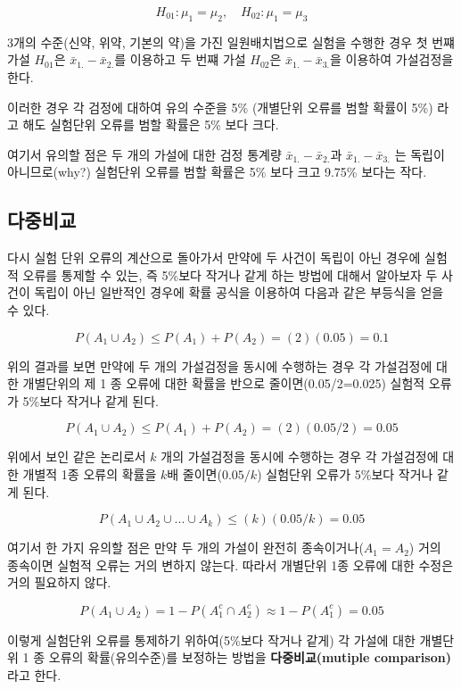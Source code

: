 \documentclass[
  10pt,
]{book}
\theoremstyle{definition}
\theoremstyle{definition}
\theoremstyle{definition}
\theoremstyle{definition}
\theoremstyle{remark}
\begin{document}
\[ H_{01}: \mu_1 = \mu_2, \quad H_{02}: \mu_1 = \mu_3 \]

3개의 수준(신약, 위약, 기본의 약)을 가진 일원배치법으로 실험을 수행한
경우 첫 번쨰 가설 \(H_{01}\)은 \({\bar x}_{1.} - {\bar x}_{2.}\)를 이용하고
두 번쨰 가설 \(H_{02}\)은 \({\bar x}_{1.} - {\bar x}_{3.}\)을 이용하여
가설검정을 한다.

이러한 경우 각 검정에 대하여 유의 수준을 5\% (개별단위 오류를 범할 확률이
5\%) 라고 해도 실험단위 오류를 범할 확률은 5\% 보다 크다.

여기서 유의할 점은 두 개의 가설에 대한 검정 통계량
\({\bar x}_{1.} - {\bar x}_{2.}\)과 \({\bar x}_{1.} - {\bar x}_{3.}\) 는
독립이 아니므로(why?) 실험단위 오류를 범할 확률은 5\% 보다 크고 9.75\%
보다는 작다.

\hypertarget{uxb2e4uxc911uxbe44uxad50-1}{%
\subsection{다중비교}\label{uxb2e4uxc911uxbe44uxad50-1}}

다시 실험 단위 오류의 계산으로 돌아가서 만약에 두 사건이 독립이 아닌
경우에 실험적 오류를 통제할 수 있는, 즉 5\%보다 작거나 같게 하는 방법에
대해서 알아보자 두 사건이 독립이 아닌 일반적인 경우에 확률 공식을
이용하여 다음과 같은 부등식을 얻을 수 있다.

\[ P( A_1 \cup A_2 )  \le  P( A_1 ) + P( A_2 ) = (2)(0.05) = 0.1 \]

위의 결과를 보면 만약에 두 개의 가설검정을 동시에 수행하는 경우 각
가설검정에 대한 개별단위의 제 1 종 오류에 대한 확률을 반으로
줄이면(0.05/2=0.025) 실험적 오류가 5\%보다 작거나 같게 된다.

\[ P( A_1 \cup A_2 )  \le  P( A_1 ) + P( A_2 ) = (2)(0.05/2) = 0.05 \]

위에서 보인 같은 논리로서 \(k\) 개의 가설검정을 동시에 수행하는 경우 각
가설검정에 대한 개별적 1종 오류의 확률을 \(k\)배 줄이면(\(0.05/k\)) 실험단위
오류가 5\%보다 작거나 같게 된다.

\[ P( A_1 \cup A_2 \cup ... \cup A_k )  \le   (k)(0.05/k) = 0.05 \]

여기서 한 가지 유의할 점은 만약 두 개의 가설이 완전히
종속이거나(\(A_1 = A_2\)) 거의 종속이면 실험적 오류는 거의 변하지 않는다.
따라서 개별단위 1종 오류에 대한 수정은 거의 필요하지 않다.

\[ P( A_1 \cup A_2 ) = 1- P(A_1^c \cap A^c_2 ) \approx 1-P(A_1^c) = 0.05 \]

이렇게 실험단위 오류를 통제하기 위하여(5\%보다 작거나 같게) 각 가설에
대한 개별단위 1 종 오류의 확률(유의수준)를 보정하는 방법을
\textbf{다중비교(mutiple comparison)} 라고 한다.
\end{document}
